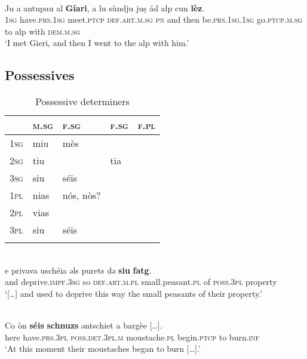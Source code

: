 {\ea\label{}
\\
\gll Ju a antupau al \textbf{Gíari}, a lu sùndju juṣ ád alp cun \textbf{lèz}.\\
  \textsc{1sg} have.\textsc{prs.1sg} meet.\textsc{ptcp} \textsc{def.art.m.sg} \textsc{pn} and then be.\textsc{prs.1sg.1sg} go.\textsc{ptcp.m.sg} to alp with \textsc{dem.m.sg}   \\
\glt `I met Gieri, and then I went to the alp with him.'
\z



\subsection{Possessives}


\begin{table}
\caption{Possessive determiners}
\label{possdet}
 \begin{tabular}{lllll}
  \lsptoprule
& \textsc{m.sg} & \textsc{f.sg}  & \textsc{f.sg}  & \textsc{f.pl}\\
  \midrule
\textsc{1sg}  & miu  &   mès &  & \\
\textsc{2sg} & tiu & & tia\\
\textsc{3sg} & siu & séis\\
\textsc{1pl} & nias & nós, nòs?\\
\textsc{2pl} & vias \\
\textsc{3pl}	& siu & séis \\
   \lspbottomrule
 \end{tabular}
\end{table}

\ea\label{}
\\
\gll   […] e privava uschéia əls purets də \textbf{siu} \textbf{fatg}.\\
     [...] and deprive.\textsc{impf.3sg} so \textsc{def.art.m.pl} small.peasant.\textsc{pl} of \textsc{poss.3pl} property\\
\glt `[…] and used to deprive this way the small peasants of their property.'
\z

\ea\label{}
\\
\gll    Co òn \textbf{séis} \textbf{schnuzs} ǝntschiet a bargèe […].\\
     here have.\textsc{prs.3pl} \textsc{poss.det.3pl.m} moustache.\textsc{pl} begin.\textsc{ptcp} to burn.\textsc{inf}\\
\glt `At this moment their moustaches began to burn […].'
\z

}
